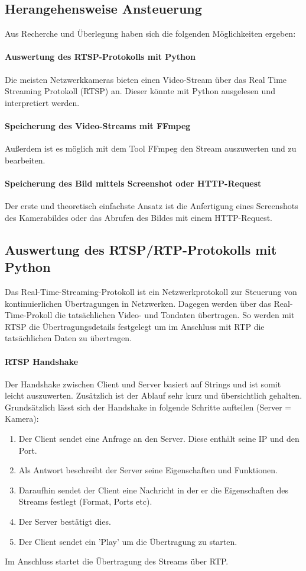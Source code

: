 \subsection{Herangehensweise Ansteuerung}
Aus Recherche und Überlegung haben sich die folgenden Möglichkeiten ergeben:

\paragraph{Auswertung des RTSP-Protokolls mit Python}
Die meisten Netzwerkkameras bieten einen Video-Stream über das Real Time Streaming Protokoll (RTSP) an. Dieser könnte mit Python ausgelesen und interpretiert werden. 

\paragraph{Speicherung des Video-Streams mit FFmpeg}
Außerdem ist es möglich mit dem Tool FFmpeg den Stream auszuwerten und zu bearbeiten.

\paragraph{Speicherung des Bild mittels Screenshot oder HTTP-Request}
Der erste und theoretisch einfachste Ansatz ist die Anfertigung eines Screenshots des Kamerabildes oder das Abrufen des Bildes mit einem HTTP-Request.  

\subsection{Auswertung des RTSP/RTP-Protokolls mit Python}
Das Real-Time-Streaming-Protokoll ist ein Netzwerkprotokoll zur Steuerung von kontinuierlichen Übertragungen in Netzwerken. Dagegen werden über das Real-Time-Prokoll die tatsächlichen Video- und Tondaten übertragen. So werden mit RTSP die Übertragungsdetails festgelegt um im Anschluss mit RTP die tatsächlichen Daten zu übertragen. \\
\paragraph{RTSP Handshake}
Der Handshake zwischen Client und Server basiert auf Strings und ist somit leicht auszuwerten. Zusätzlich ist der Ablauf sehr kurz und übersichtlich gehalten.
Grundsätzlich lässt sich der Handshake in folgende Schritte aufteilen (Server = Kamera):
\begin{enumerate}
	\item Der Client sendet eine Anfrage an den Server. Diese enthält seine IP und den Port.
	\item Als Antwort beschreibt der Server seine Eigenschaften und Funktionen. 
	\item Daraufhin sendet der Client eine Nachricht in der er die Eigenschaften des Streams festlegt (Format, Ports etc).
	\item Der Server bestätigt dies.
	\item Der Client sendet ein 'Play' um die Übertragung zu starten. 
\end{enumerate}
Im Anschluss startet die Übertragung des Streams über RTP.

